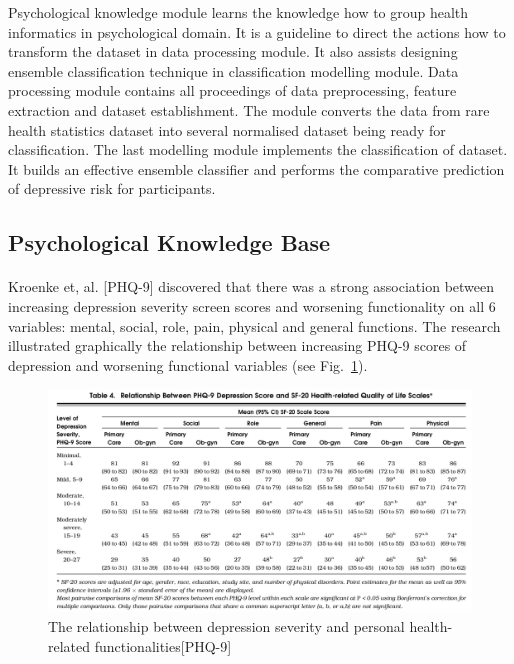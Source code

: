 \documentclass[runningheads]{llncs}
\begin{document}
%
Psychological knowledge module learns the knowledge how to group health informatics in psychological domain. It is a guideline to direct the actions how to transform the dataset in data processing module. It also assists designing ensemble classification technique in classification modelling module. Data processing module contains all proceedings of data preprocessing, feature extraction and dataset establishment. The module converts the data from rare health statistics dataset into several normalised dataset being ready for classification. The last modelling module implements the classification of dataset. It builds an effective ensemble classifier and performs the comparative prediction of depressive risk for participants. 
%
%
\subsection{Psychological Knowledge Base}
%
\paragraph{}
Kroenke et, al. [PHQ-9] discovered that there was a strong association between increasing depression severity screen scores and worsening functionality on all 6 variables: mental, social, role, pain, physical and general functions. The research illustrated graphically the relationship between increasing PHQ-9 scores of depression and worsening functional variables (see Fig.~\ref{fig2}). 
\begin{figure}[h]
\includegraphics[width=1\textwidth]{phq-9.png}
\caption{The relationship between depression severity and personal health-related functionalities[PHQ-9]} \label{fig2}
\end{figure}
\end{document}
